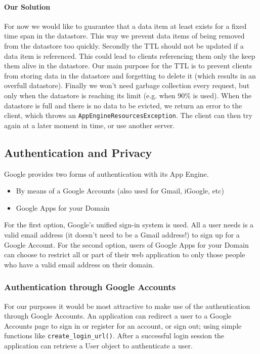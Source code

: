 \paragraph{Our Solution}
For now we would like to guarantee that a data item at least exists for a fixed
time span in the datastore. This way we prevent data items of being removed from
the datastore too quickly. Secondly the TTL should not be updated if a data item
is referenced. This could lead to clients referencing them only the keep them
alive in the datastore. Our main purpose for the TTL is to prevent clients from
storing data in the datastore and forgetting to delete it (which results in an
overfull datastore). Finally we won't need garbage collection every request, but
only when the datastore is reaching its limit (e.g. when 90\% is used). When the
datastore is full and there is no data to be evicted, we return an error to the
client, which throws an \texttt{AppEngineResourcesException}. The client can then
try again at a later moment in time, or use another server.

\subsection{Authentication and Privacy}
Google provides two forms of authentication with its App Engine.

\begin{itemize} 
\item By means of a Google Accounts (also used for Gmail, iGoogle, etc)
\item Google Apps for your Domain
\end{itemize}

For the first option, Google's unified sign-in system is used. All a user needs
is a valid email address (it doesn't need to be a Gmail address!) to sign up for
a Google Account. For the second option, users of Google Apps for your Domain can
choose to restrict all or part of their web application to only those people who
have a valid email address on their domain.

\subsubsection{Authentication through Google Accounts}
For our purposes it would be most attractive to make use of the authentication
through Google Accounts. An application can redirect a user to a Google Accounts
page to sign in or register for an account, or sign out; using simple functions
like \texttt{create\_login\_url()}. After a successful login session the
application can retrieve a User object to authenticate a user.

